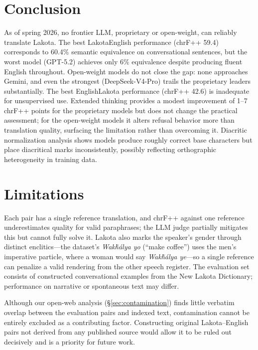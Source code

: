 \documentclass[11pt]{article}
\newcommand{\lak}[1]{\textit{#1}}
\begin{document}
\section{Conclusion}

As of spring 2026, no frontier LLM, proprietary or open-weight, can reliably translate Lakota. The best Lakota\textrightarrow English performance (chrF++ 59.4) corresponds to 60.4\% semantic equivalence on conversational sentences, but the worst model (GPT-5.2) achieves only 6\% equivalence despite producing fluent English throughout. Open-weight models do not close the gap: none approaches Gemini, and even the strongest (DeepSeek-V4-Pro) trails the proprietary leaders substantially. The best English\textrightarrow Lakota performance (chrF++ 42.6) is inadequate for unsupervised use. Extended thinking provides a modest improvement of 1--7 chrF++ points for the proprietary models but does not change the practical assessment; for the open-weight models it alters refusal behavior more than translation quality, surfacing the limitation rather than overcoming it. Diacritic normalization analysis shows models produce roughly correct base characters but place diacritical marks inconsistently, possibly reflecting orthographic heterogeneity in training data.

\section*{Limitations}

Each pair has a single reference translation, and chrF++ against one reference underestimates quality for valid paraphrases; the LLM judge partially mitigates this but cannot fully solve it. Lakota also marks the speaker's gender through distinct enclitics---the dataset's \lak{Wakȟálya yo} (``make coffee'') uses the men's imperative particle, where a woman would say \lak{Wakȟálya ye}---so a single reference can penalize a valid rendering from the other speech register. The evaluation set consists of constructed conversational examples from the New Lakota Dictionary; performance on narrative or spontaneous text may differ.

Although our open-web analysis (\S\ref{sec:contamination}) finds little verbatim overlap between the evaluation pairs and indexed text, contamination cannot be entirely excluded as a contributing factor. Constructing original Lakota--English pairs not derived from any published source would allow it to be ruled out decisively and is a priority for future work.
\end{document}
